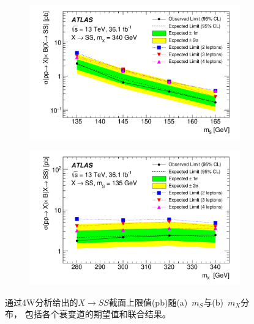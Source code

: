 \begin{figure}
  \centering
 \begin{subfigure}[b]{0.45\textwidth}
  \includegraphics[width=.85\textwidth]{fig/4W-Paper-36ifb_Paper_figures_limits_limit-comb-SS-AllSys-mS.pdf}
  \caption{}
 \end{subfigure}
 \begin{subfigure}[b]{0.45\textwidth}
  \includegraphics[width=.85\textwidth]{fig/4W-Paper-36ifb_Paper_figures_limits_limit-comb-SS-AllSys-mX.pdf}
  \caption{}
 \end{subfigure}
  \caption{通过4W分析给出的$X\rightarrow SS$截面上限值(pb)随(a)~$m_S$与(b)~$m_X$分布，
包括各个衰变道的期望值和联合结果。}
  \label{fig:limit-comb-SS-mS}
\end{figure}
